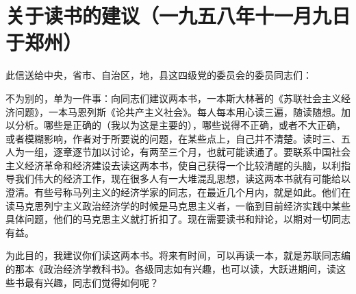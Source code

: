 \section[关于读书的建议（一九五八年十一月九日于郑州）]{关于读书的建议（一九五八年十一月九日于郑州）}


此信送给中央，省市、自治区，地，县这四级党的委员会的委员同志们：

不为别的，单为一件事：向同志们建议两本书，一本斯大林著的《苏联社会主义经济问题》，一本马恩列斯《论共产主义社会》。每人每本用心读三遍，随读随想。加以分析。哪些是正确的（我以为这是主要的），哪些说得不正确，或者不大正确，或者模糊影响，作者对于所要说的问题，在某些点上，自己并不清楚。读时三、五人为一组，逐章逐节加以讨论，有两至三个月，也就可能读通了。要联系中国社会主义经济革命和经济建设去读这两本书，使自己获得一个比较清醒的头脑，以利指导我们伟大的经济工作，现在很多人有一大堆混乱思想，读这两本书就有可能给以澄清。有些号称马列主义的经济学家的同志，在最近几个月内，就是如此。他们在读马克思列宁主义政治经济学的时候是马克思主义者，一临到目前经济实践中某些具体问题，他们的马克思主义就打折扣了。现在需要读书和辩论，以期对一切同志有益。

为此目的，我建议你们读这两本书。将来有时间，可以再读一本，就是苏联同志编的那本《政治经济学教科书》。各级同志如有兴趣，也可以读，大跃进期间，读这些书最有兴趣，同志们觉得如何呢？


